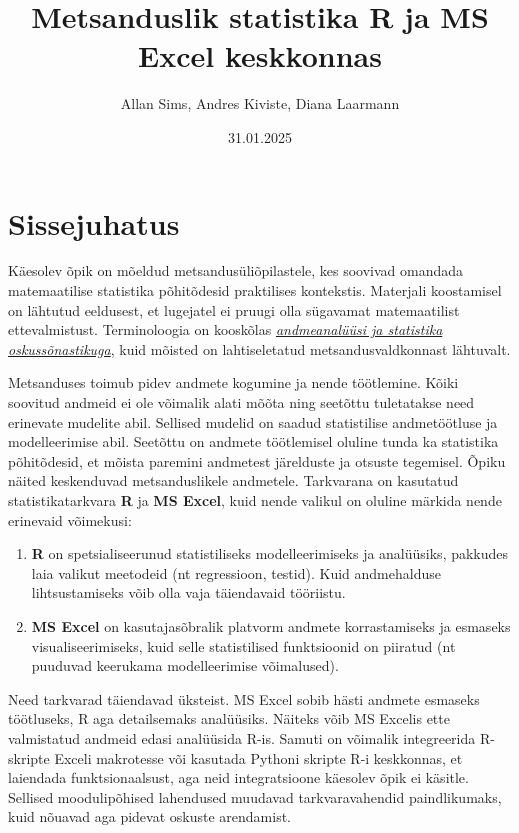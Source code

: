 \documentclass[
]{book}
\title{Metsanduslik statistika R ja MS Excel keskkonnas}
\author{Allan Sims, Andres Kiviste, Diana Laarmann}
\date{31.01.2025}
\providecommand{\tightlist}{%
  \setlength{\itemsep}{0pt}\setlength{\parskip}{0pt}}
\begin{document}
\maketitle

{
\setcounter{tocdepth}{1}
\tableofcontents
}
\chapter{Sissejuhatus}\label{sissejuhatus}

Käesolev õpik on mõeldud metsandusüliõpilastele, kes soovivad omandada matemaatilise statistika põhitõdesid praktilises kontekstis. Materjali koostamisel on lähtutud eeldusest, et lugejatel ei pruugi olla sügavamat matemaatilist ettevalmistust. Terminoloogia on kooskõlas \emph{\href{https://sonaveeb.ee/ds/aso}{andmeanalüüsi ja statistika oskussõnastikuga}}, kuid mõisted on lahtiseletatud metsandusvaldkonnast lähtuvalt.

Metsanduses toimub pidev andmete kogumine ja nende töötlemine. Kõiki soovitud andmeid ei ole võimalik alati mõõta ning seetõttu tuletatakse need erinevate mudelite abil. Sellised mudelid on saadud statistilise andmetöötluse ja modelleerimise abil. Seetõttu on andmete töötlemisel oluline tunda ka statistika põhitõdesid, et mõista paremini andmetest järelduste ja otsuste tegemisel. Õpiku näited keskenduvad metsanduslikele andmetele. Tarkvarana on kasutatud statistikatarkvara \textbf{R} ja \textbf{MS Excel}, kuid nende valikul on oluline märkida nende erinevaid võimekusi:

\begin{enumerate}
\def\labelenumi{\arabic{enumi}.}
\tightlist
\item
  \textbf{R} on spetsialiseerunud statistiliseks modelleerimiseks ja analüüsiks, pakkudes laia valikut meetodeid (nt regressioon, testid). Kuid andmehalduse lihtsustamiseks võib olla vaja täiendavaid tööriistu.\\
\item
  \textbf{MS Excel} on kasutajasõbralik platvorm andmete korrastamiseks ja esmaseks visualiseerimiseks, kuid selle statistilised funktsioonid on piiratud (nt puuduvad keerukama modelleerimise võimalused).
\end{enumerate}

Need tarkvarad täiendavad üksteist. MS Excel sobib hästi andmete esmaseks töötluseks, R aga detailsemaks analüüsiks. Näiteks võib MS Excelis ette valmistatud andmeid edasi analüüsida R-is. Samuti on võimalik integreerida R-skripte Exceli makrotesse või kasutada Pythoni skripte R-i keskkonnas, et laiendada funktsionaalsust, aga neid integratsioone käesolev õpik ei käsitle. Sellised moodulipõhised lahendused muudavad tarkvaravahendid paindlikumaks, kuid nõuavad aga pidevat oskuste arendamist.
\end{document}
